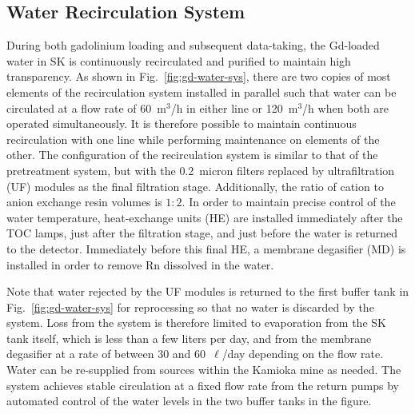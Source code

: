 \documentclass[preprint,12pt]{elsarticle}
\begin{document}

\subsection{Water Recirculation System}
During both gadolinium loading and subsequent data-taking, the Gd-loaded water in SK is continuously recirculated and purified to maintain high transparency. 
As shown in Fig.~\ref{fig:gd-water-sys}, there are two copies of most elements of the recirculation system installed in parallel such that water can be circulated at a  flow rate of 60~m$^3$/h in either line or 120~m$^3$/h when both are operated simultaneously. It is therefore possible to maintain continuous recirculation with one line while performing maintenance on elements of the other.
The configuration of the recirculation system is similar to that of the pretreatment system, but with the 0.2~micron filters replaced by ultrafiltration (UF) modules as the final filtration stage.
Additionally, the ratio of cation to anion exchange resin volumes is $1:2$.
In order to maintain precise control of the water temperature, heat-exchange units (HE) are installed immediately after the TOC lamps, just after the filtration stage, and just before the
water is returned to the detector.
Immediately before this final HE, a membrane degasifier (MD) is installed in order to remove Rn dissolved in the water.

Note that water rejected by the UF modules is returned to the first buffer tank in Fig.~\ref{fig:gd-water-sys} for reprocessing so that no water is discarded by the system. 
Loss from the system is therefore limited to evaporation from the SK tank itself, which is less than a few liters per day, and from the membrane degasifier at a rate of between 30 and 60~$\ell$/day depending on the flow rate. 
Water can be re-supplied from sources within the Kamioka mine as needed.
The system achieves stable circulation at a fixed flow rate from the return pumps by automated control of the water levels in the two buffer tanks in the figure. 

\end{document}
